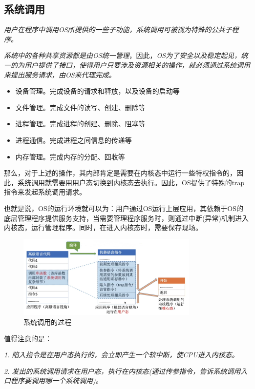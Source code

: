 \subsection{系统调用}

    \emph{用户在程序中调用OS所提供的一些子功能，系统调用可被视为特殊的公共子程序。}

    \emph{系统中的各种共享资源都是由OS统一管理}，因此，\emph{OS为了安全以及稳定起见，统一的为用户提供了接口，使得用户只要涉及资源相关的操作，就必须通过系统调用来提出服务请求，由OS来代理完成。}

\begin{itemize}
    \item 设备管理。完成设备的请求和释放，以及设备的启动等
    \item 文件管理。完成文件的读写、创建、删除等
    \item 进程管理。完成进程的创建、删除、阻塞等
    \item 进程通信。完成进程之间信息的传递等
    \item 内存管理。完成内存的分配、回收等
\end{itemize}

    那么，对于上述的操作，其内部肯定是需要在内核态中运行一些特权指令的，因此，系统调用就需要用用户态切换到内核态去执行。因此，OS提供了特殊的trap指令来发起系统调用请求。

    也就是说，OS的运行环境就可以为：用户通过OS运行上层应用，其依赖于OS的底层管理程序提供服务支持，当需要管理程序服务时，则通过中断(异常)机制进入内核态，运行管理程序。同时，在进入内核态时，需要保存现场。

\begin{figure}[!htbp]
    \centering
    \includegraphics[width=0.8\textwidth]{image/chapter01/系统调用过程.png}
    \caption{系统调用的过程}
\end{figure}

    值得注意的是：

    \emph{1. 陷入指令是在用户态执行的，会立即产生一个软中断，使CPU进入内核态。}

    \emph{2. 发出的系统调用请求在用户态，执行在内核态(通过传参指令，告诉系统调用入口程序要调用哪一个系统调用)。}

